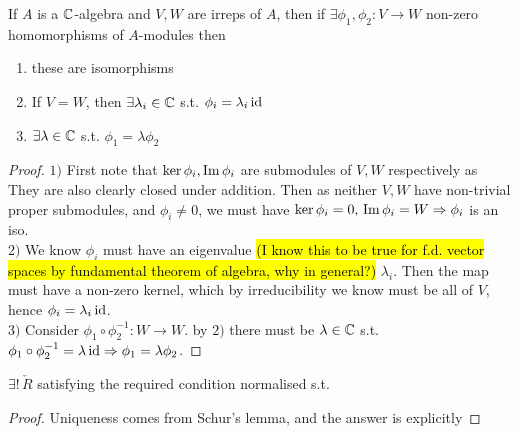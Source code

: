 \documentclass{article}
\begin{document}
\begin{lemma}
If $A$ is a $\mathbb{C}$-algebra and $V, W$ are irreps of $A$, then if $\exists \phi_1, \phi_2 : V \to W$ non-zero homomorphisms of $A$-modules then 
\begin{enumerate}
    \item these are isomorphisms
    \item If $V=W$, then $\exists \lambda_i \in \mathbb{C}$ s.t. $\phi_i = \lambda_i \operatorname{id}$
    \item $\exists \lambda \in \mathbb{C}$ s.t. $\phi_1 = \lambda \phi_2$
\end{enumerate}
\end{lemma}
\begin{proof}
$1)$ First note that $\ker \phi_i, \operatorname{Im} \phi_i $ are submodules of $V,W$ respectively as 
They are also clearly closed under addition. Then as neither $V,W$ have non-trivial proper submodules, and $\phi_i \neq 0$, we must have $\ker\phi_i = 0, \, \operatorname{Im} \phi_i = W \Rightarrow \phi_i$ is an iso. \\
$2)$ We know $\phi_i$ must have an eigenvalue \hl{(I know this to be true for f.d. vector spaces by fundamental theorem of algebra, why in general?)} $\lambda_i$. Then the map 
must have a non-zero kernel, which by irreducibility we know must be all of $V$, hence $\phi_i = \lambda_i \operatorname{id}$. \\
$3)$ Consider $\phi_1 \circ \phi_2^{-1} : W \to W$. by $2)$ there must be $\lambda \in \mathbb{C}$ s.t. $\phi_1 \circ \phi_2^{-1} = \lambda \operatorname{id} \Rightarrow \phi_1 = \lambda \phi_2$. 
\end{proof}

\begin{prop}
$\exists ! \, \check{R}$ satisfying the required condition normalised s.t. 
\end{prop}
\begin{proof}
Uniqueness comes from Schur's lemma, and the answer is explicitly 
\end{proof}
\end{document}
